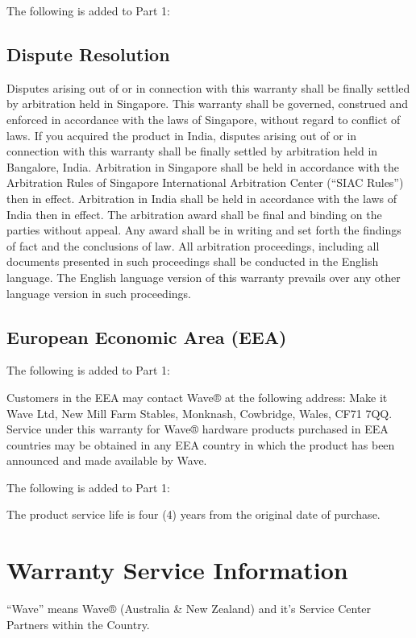 \documentclass[letterpaper,10pt,english]{sphinxmanual}
\begin{document}

The following is added to Part 1:


\subsection{Dispute Resolution}
\label{\detokenize{part2:dispute-resolution}}
Disputes arising out of or in connection with this warranty shall be finally settled by arbitration held in Singapore. This warranty shall be governed, construed and enforced in accordance with the laws of Singapore, without regard to conflict of laws. If you acquired the product in India, disputes arising out of or in connection with this warranty shall be finally settled by arbitration held in Bangalore, India. Arbitration in Singapore shall be held in accordance with the Arbitration Rules of Singapore International Arbitration Center (“SIAC Rules”) then in effect. Arbitration in India shall be held in accordance with the laws of India then in effect. The arbitration award shall be final and binding on the parties without appeal. Any award shall be in writing and set forth the findings of fact and the conclusions of law. All arbitration proceedings, including all documents presented in such proceedings shall be conducted in the English language. The English language version of this warranty prevails over any other language version in such proceedings.


\subsection{European Economic Area (EEA)}
\label{\detokenize{part2:european-economic-area-eea}}
The following is added to Part 1:

Customers in the EEA may contact Wave® at the following address: Make it Wave Ltd, New Mill Farm Stables, Monknash, Cowbridge, Wales, CF71 7QQ. Service under this warranty for Wave® hardware products purchased in EEA countries may be obtained in any EEA country in which the product has been announced and made available by Wave.


The following is added to Part 1:

The product service life is four (4) years from the original date of purchase.


\section{Warranty Service Information}
\label{\detokenize{part3:warranty-service-information}}\label{\detokenize{part3::doc}}
“Wave” means Wave® (Australia \& New Zealand) and it’s Service Center Partners within the Country.
\end{document}
